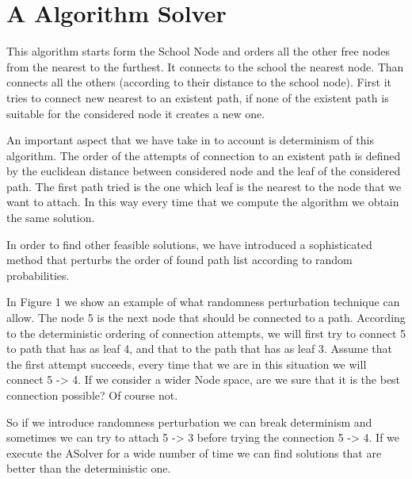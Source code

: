 \documentclass[english]{report}
\begin{document}
\section{A Algorithm Solver}
This algorithm starts form the School Node and orders all the other free nodes from the nearest to the furthest. It connects to the school the nearest node. Than connects all the others (according to their distance to the school node).
First it tries to connect new nearest to an existent path, if none of the existent path is suitable for the considered node it creates a new one.
\par An important aspect that we have take in to account is determinism of this algorithm. The order of the attempts of connection to an existent path is defined by the euclidean distance between considered node and the leaf of the considered path. The first path tried is the one which leaf is the nearest to the node that we want to attach. In this way every time that we compute the algorithm we obtain the same solution.
\par In order to find other feasible solutions, we have introduced a sophisticated method that perturbs the order of found path list according to random probabilities. 
\par In Figure 1 we show an example of what randomness perturbation technique can allow. The node 5 is the next node that should be connected to a path. According to the deterministic ordering of connection attempts, we will first try to connect 5 to path that has as leaf 4, and that to the path that has as leaf 3. Assume that the first attempt succeeds, every time that we are in this situation we will connect 5 -> 4. If we consider a wider Node space, are we sure that it is the best connection possible? Of course not.
\par So if we introduce randomness perturbation we can break determinism and sometimes we can try to attach 5  -> 3 before trying the connection 5 -> 4. If we execute the ASolver for a wide number of time we can find solutions that are better than the deterministic one.
\end{document}
